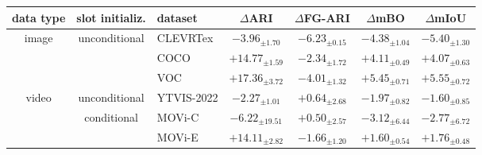 \begin{tabular}{cclcccc}
\toprule
data type
& slot initializ.
& dataset
& $\Delta$ARI
& $\Delta$FG-ARI
& $\Delta$mBO
& $\Delta$mIoU \\
\midrule
\multirow{3}{*}{image}
& \multirow{3}{*}{unconditional}
& CLEVRTex
& $-3.96_{\pm1.70}$
& $-6.23_{\pm0.15}$
& $-4.38_{\pm1.04}$
& $-5.40_{\pm1.30}$ \\
&
& COCO
& $+14.77_{\pm1.59}$
& $-2.34_{\pm1.72}$
& $+4.11_{\pm0.49}$
& $+4.07_{\pm0.63}$ \\
&
& VOC
& $+17.36_{\pm3.72}$
& $-4.01_{\pm1.32}$
& $+5.45_{\pm0.71}$
& $+5.55_{\pm0.72}$ \\
\midrule
\multirow{3}{*}{video}
& unconditional
& YTVIS-2022
& $-2.27_{\pm1.01}$
& $+0.64_{\pm2.68}$
& $-1.97_{\pm0.82}$
& $-1.60_{\pm0.85}$ \\
\cmidrule(lr){2-7}
&
\multirow{2}{*}{conditional}
& MOVi-C
& $-6.22_{\pm19.51}$
& $+0.50_{\pm2.57}$
& $-3.12_{\pm6.44}$
& $-2.77_{\pm6.72}$ \\
&
& MOVi-E
& $+14.11_{\pm2.82}$
& $-1.66_{\pm1.20}$
& $+1.60_{\pm0.54}$
& $+1.76_{\pm0.48}$ \\
\bottomrule
\end{tabular}